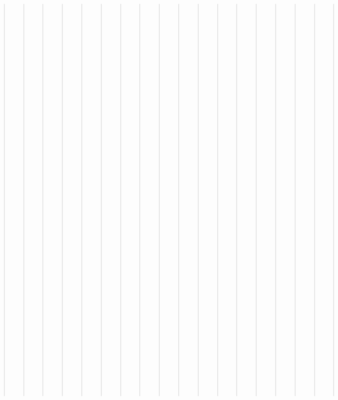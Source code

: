 \documentclass[letterpaper,10pt,english]{sphinxmanual}
\begin{document}
\begin{quote}
\begin{quote}
\begin{quote}
\begin{quote}
\begin{quote}
\begin{quote}
\begin{quote}
\begin{quote}
\begin{quote}
\begin{quote}
\begin{quote}
\begin{quote}
\begin{quote}
\begin{quote}
\begin{quote}
\begin{quote}
\begin{quote}
\begin{quote}
\begin{quote}
\begin{quote}
\begin{quote}
\begin{quote}
\begin{quote}
\begin{quote}
\begin{quote}
\begin{quote}
\begin{quote}
\begin{quote}
\begin{quote}
\begin{quote}
\begin{quote}
\begin{quote}
\begin{quote}
\begin{quote}
\begin{quote}
\begin{quote}
\begin{quote}
\begin{quote}
\begin{quote}
\begin{quote}
\begin{quote}
\begin{quote}
\begin{quote}
\begin{quote}
\begin{quote}
\begin{quote}
\begin{quote}
\begin{quote}
\begin{quote}
\begin{quote}
\begin{quote}
\begin{quote}
\begin{quote}
\begin{quote}
\begin{quote}
\begin{quote}
\begin{quote}
\begin{quote}
\begin{quote}
\begin{quote}
\begin{quote}
\begin{quote}
\begin{quote}
\begin{quote}
\begin{quote}
\begin{quote}
\begin{quote}
\begin{quote}
\begin{quote}
\begin{quote}
\begin{quote}
\begin{quote}
\begin{quote}
\begin{quote}
\begin{quote}
\begin{quote}
\begin{quote}
\begin{quote}
\begin{quote}
\begin{quote}
\begin{quote}
\begin{quote}
\begin{quote}
\begin{quote}
\begin{quote}
\begin{quote}
\begin{quote}
\begin{quote}
\begin{quote}
\label{\detokenize{database_schema:id87}}\begin{quote}

\sphinxAtStartPar
{\hyperref[\detokenize{database_schema:overview-table}]{}}.
=======
\label{\detokenize{schema_tables:id87}}\begin{quote}

\sphinxAtStartPar
{\hyperref[\detokenize{schema_tables:overview-table}]{}}.
>>>>>>> gh-pages
\end{quote}


\subsection{ID}
<<<<<<< HEAD
\label{\detokenize{database_schema:id}}


\end{quote}
\end{quote}
\end{quote}
\end{quote}
\end{quote}
\end{quote}
\end{quote}
\end{quote}
\end{quote}
\end{quote}
\end{quote}
\end{quote}
\end{quote}
\end{quote}
\end{quote}
\end{quote}
\end{quote}
\end{quote}
\end{quote}
\end{quote}
\end{quote}
\end{quote}
\end{quote}
\end{quote}
\end{quote}
\end{quote}
\end{quote}
\end{quote}
\end{quote}
\end{quote}
\end{quote}
\end{quote}
\end{quote}
\end{quote}
\end{quote}
\end{quote}
\end{quote}
\end{quote}
\end{quote}
\end{quote}
\end{quote}
\end{quote}
\end{quote}
\end{quote}
\end{quote}
\end{quote}
\end{quote}
\end{quote}
\end{quote}
\end{quote}
\end{quote}
\end{quote}
\end{quote}
\end{quote}
\end{quote}
\end{quote}
\end{quote}
\end{quote}
\end{quote}
\end{quote}
\end{quote}
\end{quote}
\end{quote}
\end{quote}
\end{quote}
\end{quote}
\end{quote}
\end{quote}
\end{quote}
\end{quote}
\end{quote}
\end{quote}
\end{quote}
\end{quote}
\end{quote}
\end{quote}
\end{quote}
\end{quote}
\end{quote}
\end{quote}
\end{quote}
\end{quote}
\end{quote}
\end{quote}
\end{quote}
\end{quote}
\end{quote}
\end{quote}
\end{quote}
\end{quote}
\end{document}
